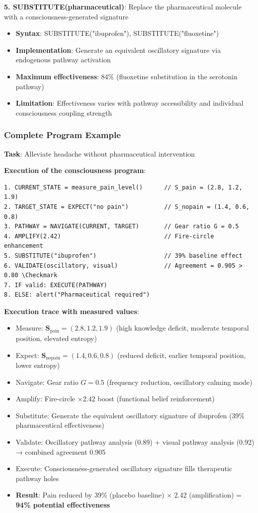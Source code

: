 \documentclass{article}
\theoremstyle{definition}
\theoremstyle{remark}
\begin{document}
\textbf{5. SUBSTITUTE(pharmaceutical)}: Replace the pharmaceutical molecule with a consciousness-generated signature
\begin{itemize}
\item \textbf{Syntax}: SUBSTITUTE("ibuprofen"), SUBSTITUTE("fluoxetine")
\item \textbf{Implementation}: Generate an equivalent oscillatory signature via endogenous pathway activation
\item \textbf{Maximum effectiveness}: 84\% (fluoxetine substitution in the serotonin pathway)
\item \textbf{Limitation}: Effectiveness varies with pathway accessibility and individual consciousness coupling strength
\end{itemize}

\subsubsection{Complete Program Example}

\textbf{Task}: Alleviate headache without pharmaceutical intervention

\textbf{Execution of the consciousness program}:
\begin{verbatim}
1. CURRENT_STATE = measure_pain_level()      // S_pain = (2.8, 1.2, 1.9)
2. TARGET_STATE = EXPECT("no pain")          // S_nopain = (1.4, 0.6, 0.8)
3. PATHWAY = NAVIGATE(CURRENT, TARGET)       // Gear ratio G = 0.5
4. AMPLIFY(2.42)                             // Fire-circle enhancement
5. SUBSTITUTE("ibuprofen")                   // 39% baseline effect
6. VALIDATE(oscillatory, visual)             // Agreement = 0.905 > 0.80 \Checkmark
7. IF valid: EXECUTE(PATHWAY)
8. ELSE: alert("Pharmaceutical required")
\end{verbatim}

\textbf{Execution trace with measured values}:
\begin{itemize}
\item Measure: $\mathbf{S}_{\text{pain}} = (2.8, 1.2, 1.9)$ (high knowledge deficit, moderate temporal position, elevated entropy)
\item Expect: $\mathbf{S}_{\text{nopain}} = (1.4, 0.6, 0.8)$ (reduced deficit, earlier temporal position, lower entropy)
\item Navigate: Gear ratio $G = 0.5$ (frequency reduction, oscillatory calming mode)
\item Amplify: Fire-circle $\times 2.42$ boost (functional belief reinforcement)
\item Substitute: Generate the equivalent oscillatory signature of ibuprofen (39\% pharmaceutical effectiveness)
\item Validate: Oscillatory pathway analysis (0.89) + visual pathway analysis (0.92) → combined agreement 0.905 \Checkmark
\item Execute: Consciousness-generated oscillatory signature fills therapeutic pathway holes
\item \textbf{Result}: Pain reduced by 39\% (placebo baseline) × 2.42 (amplification) = \textbf{94\% potential effectiveness}
\end{itemize}
\end{document}
